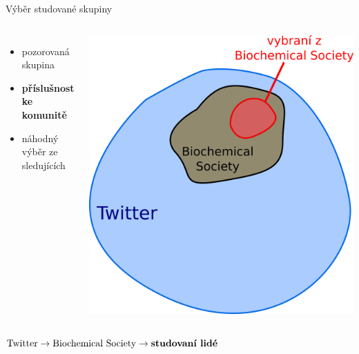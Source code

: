 \documentclass[notheorems,12pt]{beamer}
\begin{document}
\begin{frame}{Výběr studované skupiny}
    \vspace{-0.7cm}
    \begin{columns}
    \column{5cm}
    	\begin{itemize}
    		\item pozorovaná skupina
    		\item \textbf{příslušnost ke komunitě}
    		\item náhodný výběr ze sledujících
    	\end{itemize}
    \column{6cm}
    	\center
    	\includegraphics[scale=0.32]{./Pics/deeper_pics/sets.png}
    \end{columns}
    \center
    \begin{large}
        $\text{Twitter} \rightarrow \text{Biochemical Society} \rightarrow \text{\textbf{studovaní lidé}}$
    \end{large}
\end{frame}
\end{document}
